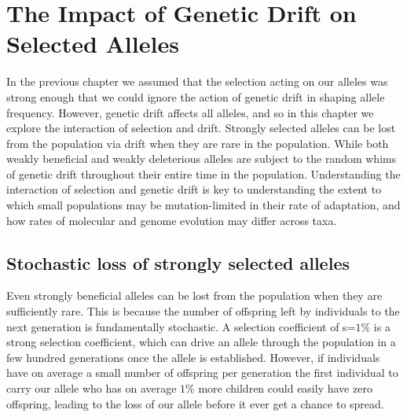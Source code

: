 \chapter{The Impact of Genetic Drift on Selected Alleles}
\label{Selection_Stochasticity}

In the previous chapter we assumed that the selection acting on our
alleles was strong enough that we could ignore the action of genetic
drift in shaping allele frequency. However, genetic drift affects all
alleles, and so in this chapter we explore the interaction of
selection and drift. Strongly selected alleles can be
lost from the population via drift when they are rare in the population. While both weakly
beneficial and weakly deleterious alleles are subject to the random
whims of genetic drift throughout their entire time in the
population. Understanding the interaction of selection and genetic
drift is key to understanding the extent to which small populations
may be mutation-limited in their rate of adaptation, and how rates of
molecular and genome evolution may differ across taxa.

\section{Stochastic loss of strongly selected alleles}

Even strongly beneficial alleles can be lost from the population when
they are sufficiently rare. This is because the number of offspring
left by individuals to the next generation is fundamentally
stochastic. A selection coefficient of s=$1\%$ is a strong
selection coefficient, which can drive an allele through the
population in a few hundred generations once the allele is
established. However, if individuals have on average a small number of
offspring per generation the first individual to carry our allele who
has on average $1\%$ more children could easily have zero offspring, leading to the loss
of our allele before it ever get a chance to spread.\\


